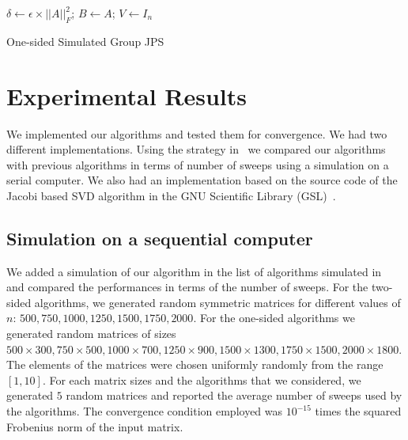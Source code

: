 \documentclass[10pt, conference, compsocconf]{IEEEtran}
\begin{document}
\begin{algorithm}
$\delta \gets \epsilon \times ||A||^2_F$; \quad $B \gets A$; \quad $V \gets I_n$\;
\caption{One-sided Simulated Group JPS}
\label{algo:simjps}
\end{algorithm}



\section{Experimental Results}
\label{sec:results}

We implemented our algorithms and tested them for convergence. We had two different implementations. Using the strategy in~\cite{rajasekaran2008relaxation} we compared our algorithms with previous algorithms in terms of number of sweeps using a simulation on a serial computer. We also had an implementation based on the source code of the Jacobi based SVD algorithm in the GNU Scientific Library (GSL)~\cite{galassi1996gnu}.

\subsection{Simulation on a sequential computer}

We added a simulation of our algorithm in the list of algorithms simulated in~\cite{rajasekaran2008relaxation} and compared the performances in terms of the number
of sweeps. For the two-sided algorithms, we generated random symmetric matrices for different values of $n$: $500, 750, 1000, 1250, 1500, 1750, 2000$. For the one-sided algorithms we generated random matrices of sizes $500 \times 300, 750 \times 500, 1000 \times 700, 1250 \times 900, 1500 \times 1300, 1750 \times 1500, 2000 \times 1800$.  The elements of the matrices were chosen uniformly randomly from the range $[1,10]$. For each matrix sizes and the algorithms that we considered, we generated $5$ random matrices and reported the average number of sweeps used by the algorithms. The convergence condition employed was $10^{-15}$ times the squared Frobenius norm of the input matrix.
\end{document}
